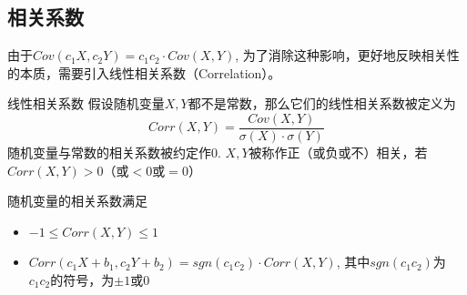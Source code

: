 
\subsection{相关系数}


\begin{frame}

由于$Cov(c_1X, c_2Y) = c_1c_2\cdot Cov(X,Y)$, 为了消除这种影响，更好地反映相关性的本质，需要引入线性相关系数（Correlation）。

\vspace{1em}
\pause

\begin{block}{线性相关系数}
假设随机变量$X,Y$都不是常数，那么它们的线性相关系数被定义为
\[Corr(X,Y) = \dfrac{Cov(X, Y)}{\sigma(X)\cdot\sigma(Y)}\]
随机变量与常数的相关系数被约定作0. $X,Y$被称作正（或负或不）相关，若$Corr(X,Y) > 0$（或$<0$或$=0$）

\vspace{1em}
\pause

随机变量的相关系数满足
\begin{itemize}
\item $-1\le Corr(X,Y) \le 1$
\item $Corr(c_1X+b_1, c_2Y+b_2) = sgn(c_1c_2) \cdot Corr(X,Y)$, 其中$sgn(c_1c_2)$为$c_1c_2$的符号，为$\pm1$或0
\end{itemize}
\end{block}

\end{frame}


